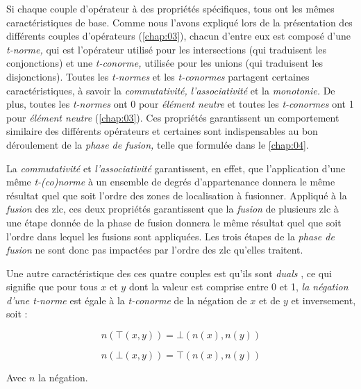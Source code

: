 Si chaque couple d'opérateur à des propriétés spécifiques, tous ont
les mêmes caractéristiques de base. Comme nous l'avons expliqué lors
de la présentation des différents couples d'opérateurs
(\autoref{chap:03}), chacun d'entre eux est composé d'une
\emph{t-norme,} qui est l'opérateur utilisé pour les intersections
(qui traduisent les conjonctions) et une \emph{t-conorme,} utilisée
pour les unions (qui traduisent les disjonctions). Toutes les
\emph{t-normes} et les \emph{t-conormes} partagent certaines
caractéristiques, à savoir la \emph{commutativité,}
\emph{l'associativité} et la \emph{monotonie.}  De plus, toutes les
\emph{t-normes} ont 0 pour \emph{élément neutre} et toutes les
\emph{t-conormes} ont 1 pour \emph{élément neutre}
(\autoref{chap:03}). Ces propriétés garantissent un comportement
similaire des différents opérateurs et certaines sont indispensables
au bon déroulement de la \emph{phase de fusion,} telle que formulée
dans le \autoref{chap:04}.

La \emph{commutativité} et \emph{l'associativité} garantissent, en
effet, que l’application d'une même \emph{t-(co)norme} à un ensemble
de degrés d'appartenance donnera le même résultat quel que soit
l'ordre des zones de localisation à fusionner. Appliqué à la
\emph{fusion} des \ac{zlc}, ces deux propriétés garantissent que la
\emph{fusion} de plusieurs \ac{zlc} à une étape donnée de la phase de
fusion donnera le même résultat quel que soit l'ordre dans lequel les
fusions sont appliquées. Les trois étapes de la \emph{phase de fusion}
ne sont donc pas impactées par l'ordre des \ac{zlc} qu'elles traitent.

Une autre caractéristique des ces quatre couples est qu'ils sont
\emph{duals} \autocite{Bouchon-Meunier2007}, ce qui signifie que pour
tous \(x\) et \(y\) dont la valeur est comprise entre 0 et 1, \emph{la
  négation d'une \emph{t-norme}} est égale à la \emph{t-conorme} de la
négation de \(x\) et de \(y\) et inversement, soit :

\begin{equation}
  n\left(⊤(x,y)\right) = ⊥\left(n(x), n(y)\right)
\end{equation}

\begin{equation}
  n\left(⊥(x,y)\right) = ⊤\left(n(x), n(y)\right)
\end{equation}

Avec \(n\) la négation.

